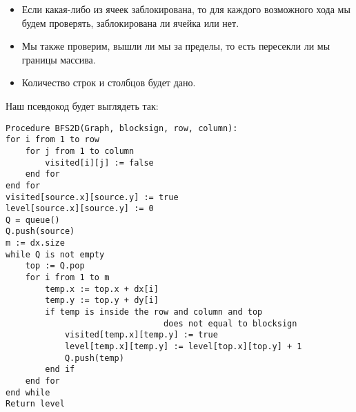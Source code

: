 \begin{itemize}
    \item Если какая-либо из ячеек заблокирована, то для каждого возможного хода мы будем проверять, заблокирована ли ячейка или нет.
    \item Мы также проверим, вышли ли мы за пределы, то есть пересекли ли мы границы массива.
    \item Количество строк и столбцов будет дано.
\end{itemize}

Наш псевдокод будет выглядеть так:

\begin{tcolorbox}
\begin{verbatim}
Procedure BFS2D(Graph, blocksign, row, column): 
for i from 1 to row    
	for j from 1 to column        
		visited[i][j] := false    
	end for 
end for 
visited[source.x][source.y] := true 
level[source.x][source.y] := 0 
Q = queue() 
Q.push(source) 
m := dx.size 
while Q is not empty    
	top := Q.pop    
	for i from 1 to m
		temp.x := top.x + dx[i]        
		temp.y := top.y + dy[i]        
		if temp is inside the row and column and top 
		                        does not equal to blocksign
			visited[temp.x][temp.y] := true            
			level[temp.x][temp.y] := level[top.x][top.y] + 1            
			Q.push(temp)
		end if
	end for
end while
Return level
\end{verbatim}
\end{tcolorbox}